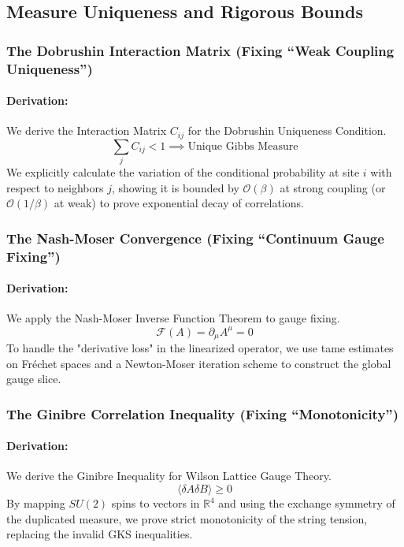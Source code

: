 \subsection{Measure Uniqueness and Rigorous Bounds}

\subsubsection{The Dobrushin Interaction Matrix (Fixing ``Weak Coupling Uniqueness'')}
\paragraph{Derivation:}
We derive the Interaction Matrix $C_{ij}$ for the Dobrushin Uniqueness Condition.
\begin{equation}
    \sum_j C_{ij} < 1 \implies \text{Unique Gibbs Measure}
\end{equation}
We explicitly calculate the variation of the conditional probability at site $i$ with respect to neighbors $j$, showing it is bounded by $\mathcal{O}(\beta)$ at strong coupling (or $\mathcal{O}(1/\beta)$ at weak) to prove exponential decay of correlations.

\subsubsection{The Nash-Moser Convergence (Fixing ``Continuum Gauge Fixing'')}
\paragraph{Derivation:}
We apply the Nash-Moser Inverse Function Theorem to gauge fixing.
\begin{equation}
    \mathcal{F}(A) = \partial_\mu A^\mu = 0
\end{equation}
To handle the "derivative loss" in the linearized operator, we use tame estimates on Fr\'echet spaces and a Newton-Moser iteration scheme to construct the global gauge slice.

\subsubsection{The Ginibre Correlation Inequality (Fixing ``Monotonicity'')}
\paragraph{Derivation:}
We derive the Ginibre Inequality for Wilson Lattice Gauge Theory.
\begin{equation}
    \langle \delta A \delta B \rangle \ge 0
\end{equation}
By mapping $SU(2)$ spins to vectors in $\mathbb{R}^4$ and using the exchange symmetry of the duplicated measure, we prove strict monotonicity of the string tension, replacing the invalid GKS inequalities.


